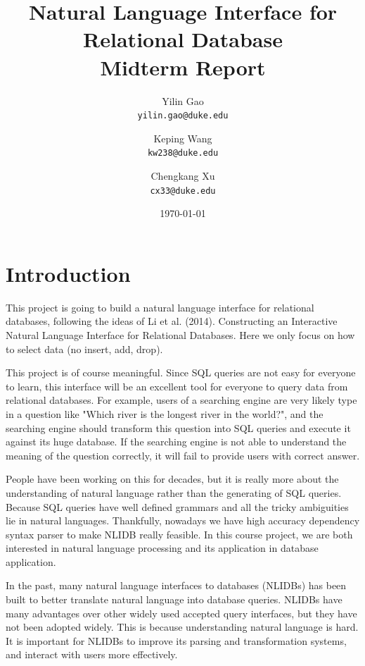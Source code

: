 \documentclass[twocolumn]{article}
\begin{document}
\title{Natural Language Interface for Relational Database\\
	\small{Midterm Report}}

\author{Yilin Gao \\
	\small \texttt{yilin.gao@duke.edu} \and 
	Keping Wang \\
	\small \texttt{kw238@duke.edu} \and 
	Chengkang Xu \\
	\small \texttt{cx33@duke.edu} }
	
\date{\today}
\maketitle

\section{Introduction}\label{sec:introduction}

This project is going to build a natural language interface for relational databases, following the ideas of Li et al. (2014)\cite{li2014}. Constructing an Interactive Natural Language Interface for Relational Databases. Here we only focus on how to select data (no insert, add, drop).
	
This project is of course meaningful. Since SQL queries are not easy for everyone to learn, this interface will be an excellent tool for everyone to query data from relational databases. For example, users of a searching engine are very likely type in a question like "Which river is the longest river in the world?", and the searching engine should transform this question into SQL queries and execute it against its huge database. If the searching engine is not able to understand the meaning of the question correctly, it will fail to provide users with correct answer.
    
People have been working on this for decades, but it is really more about the understanding of natural language rather than the generating of SQL queries. Because SQL queries have well defined grammars and all the tricky ambiguities lie in natural languages. Thankfully, nowadays we have high accuracy dependency syntax parser to make NLIDB really feasible. In this course project, we are both interested in natural language processing and its application in database application.
    
In the past, many natural language interfaces to databases (NLIDBs) has been built to better translate natural language into database queries. NLIDBs have many advantages over other widely used accepted query interfaces, but they have not been adopted widely. This is because understanding natural language is hard. It is important for NLIDBs to improve its parsing and transformation systems, and interact with users more effectively. \cite{li2014}
      
\end{document}
